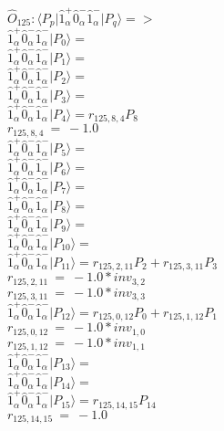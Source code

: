 \documentclass[14pt]{article}
\begin{document}
    $\hat{O}_{125}:  \langle{P_p}\vert \hat{1}_{\alpha}^{+}\hat{0}_{\alpha}^{-}\hat{1}_{\alpha}^{-} \vert{P_q}\rangle => $ \\ 
    $ \hat{1}_{\alpha}^{+}\hat{0}_{\alpha}^{-}\hat{1}_{\alpha}^{-} \vert{P_{0}}\rangle =  $ \\ 
    $ \hat{1}_{\alpha}^{+}\hat{0}_{\alpha}^{-}\hat{1}_{\alpha}^{-} \vert{P_{1}}\rangle =  $ \\ 
    $ \hat{1}_{\alpha}^{+}\hat{0}_{\alpha}^{-}\hat{1}_{\alpha}^{-} \vert{P_{2}}\rangle =  $ \\ 
    $ \hat{1}_{\alpha}^{+}\hat{0}_{\alpha}^{-}\hat{1}_{\alpha}^{-} \vert{P_{3}}\rangle =  $ \\ 
    $ \hat{1}_{\alpha}^{+}\hat{0}_{\alpha}^{-}\hat{1}_{\alpha}^{-} \vert{P_{4}}\rangle = {r}_{125,8,4}P_{8} $ \\ 
    ${r}_{125,8,4}\ =\ -1.0 $ \\ 
    $ \hat{1}_{\alpha}^{+}\hat{0}_{\alpha}^{-}\hat{1}_{\alpha}^{-} \vert{P_{5}}\rangle =  $ \\ 
    $ \hat{1}_{\alpha}^{+}\hat{0}_{\alpha}^{-}\hat{1}_{\alpha}^{-} \vert{P_{6}}\rangle =  $ \\ 
    $ \hat{1}_{\alpha}^{+}\hat{0}_{\alpha}^{-}\hat{1}_{\alpha}^{-} \vert{P_{7}}\rangle =  $ \\ 
    $ \hat{1}_{\alpha}^{+}\hat{0}_{\alpha}^{-}\hat{1}_{\alpha}^{-} \vert{P_{8}}\rangle =  $ \\ 
    $ \hat{1}_{\alpha}^{+}\hat{0}_{\alpha}^{-}\hat{1}_{\alpha}^{-} \vert{P_{9}}\rangle =  $ \\ 
    $ \hat{1}_{\alpha}^{+}\hat{0}_{\alpha}^{-}\hat{1}_{\alpha}^{-} \vert{P_{10}}\rangle =  $ \\ 
    $ \hat{1}_{\alpha}^{+}\hat{0}_{\alpha}^{-}\hat{1}_{\alpha}^{-} \vert{P_{11}}\rangle = {r}_{125,2,11}P_{2}+{r}_{125,3,11}P_{3} $ \\ 
    ${r}_{125,2,11}\ =\ -1.0*{inv}_{3,2} $ \\ 
    ${r}_{125,3,11}\ =\ -1.0*{inv}_{3,3} $ \\ 
    $ \hat{1}_{\alpha}^{+}\hat{0}_{\alpha}^{-}\hat{1}_{\alpha}^{-} \vert{P_{12}}\rangle = {r}_{125,0,12}P_{0}+{r}_{125,1,12}P_{1} $ \\ 
    ${r}_{125,0,12}\ =\ -1.0*{inv}_{1,0} $ \\ 
    ${r}_{125,1,12}\ =\ -1.0*{inv}_{1,1} $ \\ 
    $ \hat{1}_{\alpha}^{+}\hat{0}_{\alpha}^{-}\hat{1}_{\alpha}^{-} \vert{P_{13}}\rangle =  $ \\ 
    $ \hat{1}_{\alpha}^{+}\hat{0}_{\alpha}^{-}\hat{1}_{\alpha}^{-} \vert{P_{14}}\rangle =  $ \\ 
    $ \hat{1}_{\alpha}^{+}\hat{0}_{\alpha}^{-}\hat{1}_{\alpha}^{-} \vert{P_{15}}\rangle = {r}_{125,14,15}P_{14} $ \\ 
    ${r}_{125,14,15}\ =\ -1.0 $ \\ 
    
\end{document}
